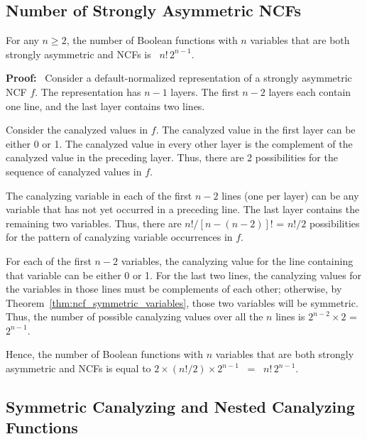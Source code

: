 \subsection{Number of Strongly Asymmetric NCFs}
\label{sse:number_strongly_asymmetric}

\begin{theorem}\label{thm:count_strongly_asymmetric}
For any $n \geq 2$, the number of Boolean functions with $n$ variables 
that are both strongly asymmetric and NCFs is~ $n! \, 2^{n-1}$.
\end{theorem}

\noindent
\textbf{Proof:}~
Consider a default-normalized representation of a strongly asymmetric NCF $f$.
The representation has $n-1$ layers.
The first $n-2$ layers each contain one line, and the last layer contains two lines.

Consider the canalyzed values in $f$. The canalyzed value in the
first layer can be either 0 or 1.  The canalyzed value in every
other layer is the complement of the canalyzed value in the preceding
layer.  Thus, there are 2 possibilities for the sequence of canalyzed
values in $f$.

The canalyzing variable in each of the first $n-2$ lines (one per
layer) can be any variable that has not yet occurred in a preceding
line.  The last layer contains the remaining two variables.  Thus,
there are $n! /[n-(n-2)]!$ = $n!/2$ possibilities for the pattern of 
canalyzing variable occurrences in $f$.

For each of the first $n-2$ variables, the canalyzing value for the line
containing that variable can be either 0 or 1.  
For the last two lines, the canalyzing values for the variables 
in those lines must be complements of each other; otherwise, by 
Theorem~\ref{thm:ncf_symmetric_variables}, those two variables 
will be symmetric.
Thus, the number of possible canalyzing values over all the $n$
lines is $2^{n-2} \times 2$ = $2^{n-1}$.

Hence, the number of Boolean functions with $n$ variables that
are both strongly asymmetric and NCFs is equal to 
$2 \times (n!/2) \times 2^{n-1}$ ~=~ $n!\,2^{n-1}$.  \QED


\subsection{Symmetric Canalyzing and Nested Canalyzing Functions}
\label{sse:sym_and_cf_ncf}

